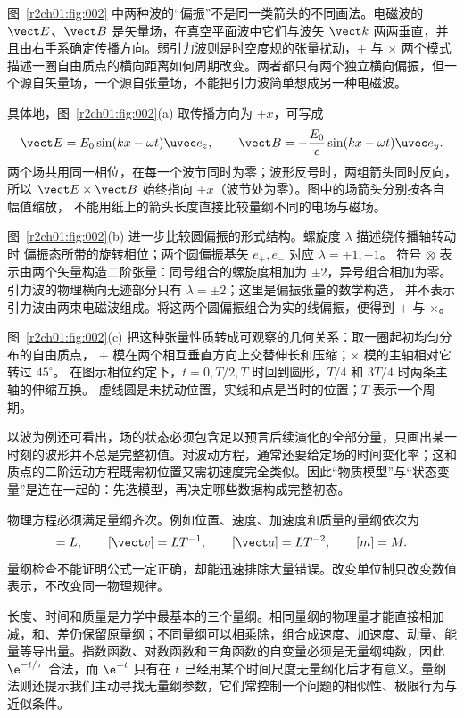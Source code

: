 \figFieldWaves

图~\ref{r2ch01:fig:002} 中两种波的“偏振”不是同一类箭头的不同画法。电磁波的 $\vect E$、$\vect B$ 是矢量场，在真空平面波中它们与波矢 $\vect k$ 两两垂直，并且由右手系确定传播方向。弱引力波则是时空度规的张量扰动，$+$ 与 $\times$ 两个模式描述一圈自由质点的横向距离如何周期改变。两者都只有两个独立横向偏振，但一个源自矢量场，一个源自张量场，不能把引力波简单想成另一种电磁波。

具体地，图~\ref{r2ch01:fig:002}(a) 取传播方向为 $+x$，可写成
\[
 \vect E=E_0\sin(kx-\omega t)\uvec e_z,\qquad
 \vect B=-\frac{E_0}{c}\sin(kx-\omega t)\uvec e_y.
\]
两个场共用同一相位，在每一个波节同时为零；波形反号时，两组箭头同时反向，
所以 $\vect E\times\vect B$ 始终指向 $+x$（波节处为零）。图中的场箭头分别按各自幅值缩放，
不能用纸上的箭头长度直接比较量纲不同的电场与磁场。

图~\ref{r2ch01:fig:002}(b) 进一步比较圆偏振的形式结构。螺旋度 $\lambda$ 描述绕传播轴转动时
偏振态所带的旋转相位；两个圆偏振基矢 $e_+,e_-$ 对应 $\lambda=+1,-1$。
符号 $\otimes$ 表示由两个矢量构造二阶张量：同号组合的螺旋度相加为 $\pm2$，异号组合相加为零。
引力波的物理横向无迹部分只有 $\lambda=\pm2$；这里是偏振张量的数学构造，
并不表示引力波由两束电磁波组成。将这两个圆偏振组合为实的线偏振，便得到 $+$ 与 $\times$。

图~\ref{r2ch01:fig:002}(c) 把这种张量性质转成可观察的几何关系：取一圈起初均匀分布的自由质点，
$+$ 模在两个相互垂直方向上交替伸长和压缩；$\times$ 模的主轴相对它转过 $45^\circ$。
在图示相位约定下，$t=0,T/2,T$ 时回到圆形，$T/4$ 和 $3T/4$ 时两条主轴的伸缩互换。
虚线圆是未扰动位置，实线和点是当时的位置；$T$ 表示一个周期。

以波为例还可看出，场的状态必须包含足以预言后续演化的全部分量，只画出某一时刻的波形并不总是完整初值。对波动方程，通常还要给定场的时间变化率；这和质点的二阶运动方程既需初位置又需初速度完全类似。因此“物质模型”与“状态变量”是连在一起的：先选模型，再决定哪些数据构成完整初态。

物理方程必须满足量纲齐次。例如位置、速度、加速度和质量的量纲依次为
\begin{equation}
  [\vect r]=L,\qquad [\vect v]=LT^{-1},\qquad
  [\vect a]=LT^{-2},\qquad [m]=M.
  \label{r2ch01:eq:005}
\end{equation}
量纲检查不能证明公式一定正确，却能迅速排除大量错误。改变单位制只改变数值表示，不改变同一物理规律。

长度、时间和质量是力学中最基本的三个量纲。相同量纲的物理量才能直接相加减，和、差仍保留原量纲；不同量纲可以相乘除，组合成速度、加速度、动量、能量等导出量。指数函数、对数函数和三角函数的自变量必须是无量纲纯数，因此 $\e^{-t/\tau}$ 合法，而 $\e^{-t}$ 只有在 $t$ 已经用某个时间尺度无量纲化后才有意义。量纲法则还提示我们主动寻找无量纲参数，它们常控制一个问题的相似性、极限行为与近似条件。

